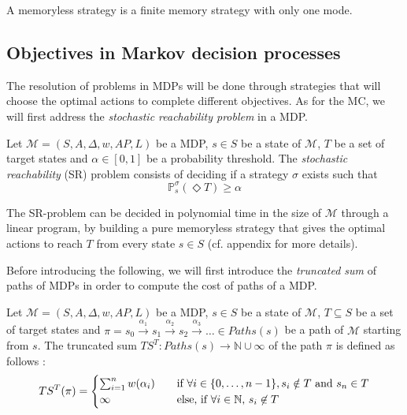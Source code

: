 \begin{property}
  A memoryless strategy is a finite memory strategy with only one mode.
\end{property}

\subsection{Objectives in Markov decision processes}
The resolution of problems in MDPs will be done through strategies that will choose the optimal actions to complete different objectives. As for the MC, we will first address the \textit{stochastic reachability problem} in a MDP.
\begin{definition}
  Let $\mathcal{M}=(S, A, \Delta, w, AP, L)$ be a MDP, $s \in S$ be a state of $\mathcal{M}$, $T$ be a set of target states and $\alpha \in [0, 1]$ be
  a probability threshold. The \textit{stochastic reachability} (SR) problem consists
  of deciding if a strategy $\sigma$ exists such that
  \[
    \mathbb{P}_s^\sigma(\Diamond T) \geq \alpha
  \]
\end{definition}

\begin{theorem}
  The SR-problem can be decided in polynomial time in the size of $\mathcal{M}$
  through a linear program, by building a pure memoryless strategy that gives the optimal actions to reach $T$ from every state $s \in S$ (cf. appendix for more details).
\end{theorem}

Before introducing the following, we will first introduce the \textit{truncated sum} of paths of MDPs in order to compute the cost of paths of a MDP.

\begin{definition}
	Let $\mathcal{M} = (S, A, \Delta, w, AP, L)$ be a MDP, $s \in S$ be a state of $\mathcal{M}$, $T \subseteq S$ be a set of target states and
	$\pi = s_0 \xrightarrow{\alpha_1} s_1 \xrightarrow{\alpha_2} s_2 \xrightarrow{\alpha_3} \dots \in Paths(s)$ be a path of
	$\mathcal{M}$ starting from $s$. The truncated sum $TS^T : Paths(s)
	\rightarrow \mathbb{N} \cup {\infty}$ of the path $\pi$ is defined as follows :
	\[
		TS^T(\pi) =
		\begin{cases}
			\sum_{i = 1}^{n} w(\alpha_i) & \quad \text{if } \forall i \in \{0, \dots, n - 1\}, s_i \notin T \text{ and } s_n \in T \\
			\infty & \quad \text{else, if $ \forall i \in \mathbb{N}, \, s_i \not\in T$}
		\end{cases}
	\]

\end{definition}

